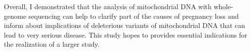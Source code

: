 
Overall, I demonstrated that the analysis of mitochondrial DNA with
whole-genome sequencing  can help to clarify part of the causes of
pregnancy loss and inform about implications of deleterious
variants of mitochondrial DNA that can lead to very serious disease.
This study hopes to provides essential indications for the realization of a larger study.







